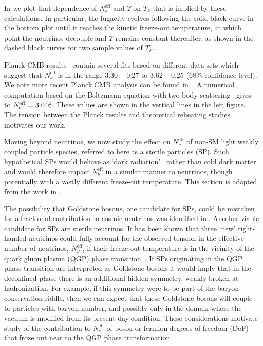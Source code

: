  In  we plot that dependence of $N^{\mathrm{eff}}_\nu$ and $\Upsilon$ on $T_k$ that is implied by these calculations. In particular, the fugacity evolves following the solid black curve in the bottom plot until it reaches the kinetic freeze-out temperature, at which point the neutrinos decouple and $\Upsilon$ remains constant thereafter, as shown in the dashed black curves for two sample values of $T_k$. 
 

 
Planck CMB results~\cite{Planck:2013pxb} contain several fits based on different data sets which suggest that $N^{\mathrm{eff}}_\nu$ is in the range $3.30\pm 0.27$ to $3.62\pm0.25$ ($68\%$ confidence level). We note more recent Planck CMB analysis can be found in~\cite{Planck:2018vyg}. A numerical computation based on the Boltzmann equation with two body scattering~\cite{Mangano:2005cc} gives to $N_{\nu}^{\rm eff}=3.046$. These values are shown in the vertical lines in the left figure. The tension between the Planck results and theoretical reheating studies motivates our work.

Moving beyond neutrinos, we now study the effect on $N_\nu^{\text{eff}}$ of non-SM light weakly coupled particle species, referred to here as a sterile particles (SP). Such hypothetical SPs would behave as `dark radiation'~\cite{Steigman:2013yua} rather than cold dark matter and would therefore impact $N_\nu^{\text{eff}}$ in a similar manner to neutrinos, though potentially with a vastly different freeze-out temperature. This section is adapted from the work in \cite{Birrell:2014cja}.


The possibility that Goldstone bosons, one candidate for SPs, could be mistaken for a fractional contribution to cosmic neutrinos was identified in \cite{Weinberg:2013kea}. Another viable candidate for SPs are sterile neutrinos. It has been shown that three `new' right-handed neutrinos could fully account for the observed tension in the effective number of neutrinos, $N^{\text{eff}}_{\nu}$, if their freeze-out temperature is in the vicinity of the quark gluon plasma (QGP) phase transition~\cite{Anchordoqui:2011nh,Anchordoqui:2012qu}. If SPs originating in the QGP phase transition are interpreted as Goldstone bosons it would imply that in the deconfined phase there is an additional hidden symmetry, weakly broken at hadronization. For example, if this symmetry were to be part of the baryon conservation riddle, then we can expect that these Goldstone bosons will couple to particles with baryon number, and possibly only in the domain where the vacuum is modified from its present day condition. These considerations motivate study of the contribution to 
$N^{\text{eff}}_{\nu}$ of boson or fermion degrees of freedom (DoF) that froze out near to the QGP phase transformation. 

